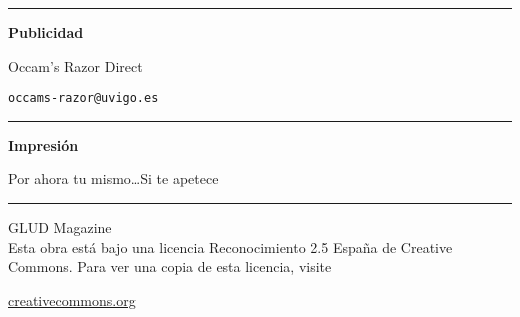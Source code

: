 \begin{textblock}{30}
\begin{minipage}{0.12\linewidth}
\begin{center}
\hrule

\vspace{4mm}

{\bf Publicidad}

\vspace{3mm}

Occam's Razor Direct

{\tt occams-razor@uvigo.es}

\vspace{4mm}

\hrule

\vspace{6mm}

{\bf Impresión}

Por ahora tu mismo\ldots Si te apetece

\vspace{3mm}

\hrule

\vspace{9mm}

 GLUD Magazine \\

Esta obra está bajo una licencia Reconocimiento 2.5 España de Creative
Commons. Para ver una copia de esta licencia, visite 

{\scriptsize \href{http://creativecommons.org/licenses/by/2.5/es/}{creativecommons.org}} 

\end{center}
\end{minipage}

\end{textblock}

